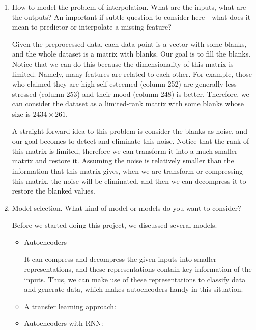 \documentclass[11pt, a4paper]{article}
\makeatletter
\def\namedlabel#1#2{\begingroup
	\def\@currentlabel{#2}%
	\phantomsection\label{#1}\endgroup
}
\makeatother
\begin{document}
\begin{enumerate}
	\item{How to model the problem of interpolation. What are the inputs, what are the outputs? An important if subtle question to consider here - what does it mean to predictor or interpolate a missing feature?}
	\namedlabel{interpolation}{Formalization of interpolation}
	\par{Given the preprocessed data, each data point is a vector with some blanks, and the whole dataset is a matrix with blanks. Our goal is to fill the blanks. Notice that we can do this because the dimensionality of this matrix is limited. Namely, many features are related to each other. For example, those who claimed they are high self-esteemed (column 252) are generally less stressed (column 253) and their mood (column 248) is better. Therefore, we can consider the dataset as a limited-rank matrix with some blanks whose size is $2434 \times 261$.}
	\par{A straight forward idea to this problem is consider the blanks as noise, and our goal becomes to detect and eliminate this noise. Notice that the rank of this matrix is limited, therefore we can transform it into a much smaller matrix and restore it. Assuming the noise is relatively smaller than the information that this matrix gives, when we are transform or compressing this matrix, the noise will be eliminated, and then we can decompress it to restore the blanked values.}
	
	\item{Model selection. What kind of model or models do you want to consider?}
	\par{Before we started doing this project, we discussed several models.}
	\begin{itemize}
		\item {Autoencoders}
		\par{It can compress and decompress the given inputs into smaller representations, and these representations contain key information of the inputs. Thus, we can make use of these representations to classify data and generate data, which makes autoencoders handy in this situation.}
		\item {A transfer learning approach:}
		\item {Autoencoders with RNN:}
	\end{itemize}
	

\end{enumerate}
\end{document}
